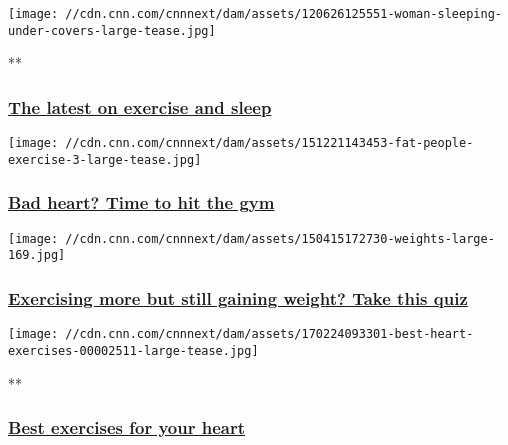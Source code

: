 \href{/videos/tv/2017/05/26/exercise-and-sleep-explained.cnn}{}

\texttt{[image: //cdn.cnn.com/cnnnext/dam/assets/120626125551-woman-sleeping-under-covers-large-tease.jpg]}

**

\hypertarget{the-latest-on-exercise-and-sleep}{%
\subsubsection{\texorpdfstring{\href{/videos/tv/2017/05/26/exercise-and-sleep-explained.cnn}{The
latest on exercise and
sleep}}{The latest on exercise and sleep}}\label{the-latest-on-exercise-and-sleep}}

\href{/2017/02/24/health/heart-exercises-interval-training-fitness/index.html}{}

\texttt{[image: //cdn.cnn.com/cnnnext/dam/assets/151221143453-fat-people-exercise-3-large-tease.jpg]}

\hypertarget{bad-heart-time-to-hit-the-gym}{%
\subsubsection{\texorpdfstring{\href{/2017/02/24/health/heart-exercises-interval-training-fitness/index.html}{Bad
heart? Time to hit the
gym}}{Bad heart? Time to hit the gym}}\label{bad-heart-time-to-hit-the-gym}}

\href{/2015/11/24/health/weight-gain-despite-exercise/index.html}{}

\texttt{[image: //cdn.cnn.com/cnnnext/dam/assets/150415172730-weights-large-169.jpg]}

\hypertarget{exercising-more-but-still-gaining-weight-take-this-quiz}{%
\subsubsection{\texorpdfstring{\href{/2015/11/24/health/weight-gain-despite-exercise/index.html}{Exercising
more but still gaining weight? Take this
quiz}}{Exercising more but still gaining weight? Take this quiz}}\label{exercising-more-but-still-gaining-weight-take-this-quiz}}

\href{/videos/health/2017/02/23/best-heart-exercises.cnn}{}

\texttt{[image: //cdn.cnn.com/cnnnext/dam/assets/170224093301-best-heart-exercises-00002511-large-tease.jpg]}

**

\hypertarget{best-exercises-for-your-heart}{%
\subsubsection{\texorpdfstring{\href{/videos/health/2017/02/23/best-heart-exercises.cnn}{Best
exercises for your
heart}}{Best exercises for your heart}}\label{best-exercises-for-your-heart}}

